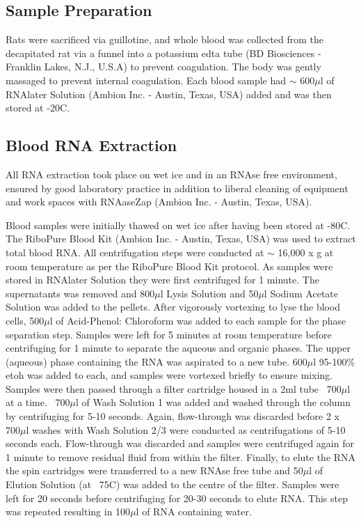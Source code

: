 \subsection{Sample Preparation}
Rats were sacrificed via guillotine, and whole blood was collected from the decapitated rat via a funnel into a potassium \acrfull{edta} tube (BD Biosciences - Franklin Lakes, N.J., U.S.A) to prevent coagulation. The body was gently massaged to prevent internal coagulation. Each blood sample had $\sim$ 600$\mu$l of RNAlater Solution (Ambion Inc. - Austin, Texas, USA) added and was then stored at -20\degree C. 

\subsection{Blood RNA Extraction}
All RNA extraction took place on wet ice and in an RNAse free environment, ensured by good laboratory practice in addition to liberal cleaning of equipment and work spaces with RNAaseZap (Ambion Inc. - Austin, Texas, USA). 

Blood samples were initially thawed on wet ice after having been stored at -80\degree C. The RiboPure Blood Kit (Ambion Inc. - Austin, Texas, USA) was used to extract total blood RNA. All centrifugation steps were conducted at $\sim$ 16,000 x g at room temperature as per the RiboPure Blood Kit protocol. As samples were stored in RNAlater Solution they were first centrifuged for 1 minute. The supernatants was removed and 800$\mu$l Lysis Solution and 50$\mu$l Sodium Acetate Solution was added to the pellets. After vigorously vortexing to lyse the blood cells, 500$\mu$l of Acid-Phenol: Chloroform was added to each sample for the phase separation step. Samples were left for 5 minutes at room temperature before centrifuging for 1 minute to separate the aqueous and organic phases. The upper (aqueous) phase containing the RNA was aspirated to a new tube. 600$\mu$l 95-100\% \acrfull{etoh} was added to each, and samples were vortexed briefly to ensure mixing. Samples were then passed through a filter cartridge housed in a 2ml tube ~700$\mu$l at a time. ~700$\mu$l of Wash Solution 1 was added and washed through the column by centrifuging for 5-10 seconds. Again, flow-through was discarded before 2 x 700$\mu$l washes with Wash Solution 2/3 were conducted as centrifugations of 5-10 seconds each. Flow-through was discarded and samples were centrifuged again for 1 minute to remove residual fluid from within the filter. Finally, to elute the RNA the spin cartridges were transferred to a new RNAse free tube and 50$\mu$l of Elution Solution (at ~75\degree C) was added to the centre of the filter. Samples were left for 20 seconds before centrifuging for 20-30 seconds to elute RNA. This step was repeated resulting in 100$\mu$l of RNA containing water. 


